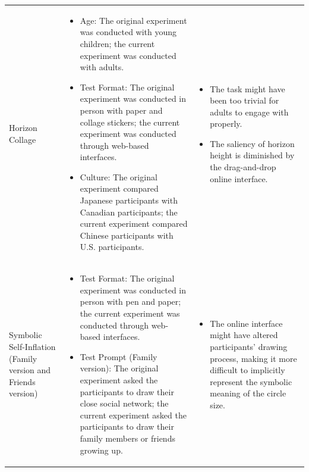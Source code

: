 \documentclass[
  man,floatsintext]{apa6}
\begin{document}
\begin{landscape}
\begin{longtable}{p{3cm}p{10cm}p{8cm}}
Horizon Collage  & 
    \begin{itemize}
        \item Age: The original experiment was conducted with young children; the current experiment was conducted with adults.
        \item Test Format: The original experiment was conducted in person with paper and collage stickers; the current experiment was conducted through web-based interfaces.
        \item Culture: The original experiment compared Japanese participants with Canadian participants; the current experiment compared Chinese participants with U.S. participants.
    \end{itemize} &
    \begin{itemize}
        \item The task might have been too trivial for adults to engage with properly. 
        \item The saliency of horizon height is diminished by the drag-and-drop online interface.
    \end{itemize}
    \\

Symbolic Self-Inflation (Family version and Friends version) & 
    \begin{itemize}
        \item Test Format: The original experiment was conducted in person with pen and paper; the current experiment was conducted through web-based interfaces.
        \item Test Prompt (Family version): The original experiment asked the participants to draw their close social network; the current experiment asked the participants to draw their family members or friends growing up.
    \end{itemize} & 
    \begin{itemize}
        \item The online interface might have altered participants’ drawing process, making it more difficult to implicitly represent the symbolic meaning of the circle size.
    \end{itemize}
     \\


\end{longtable}
\end{landscape}
\end{document}
